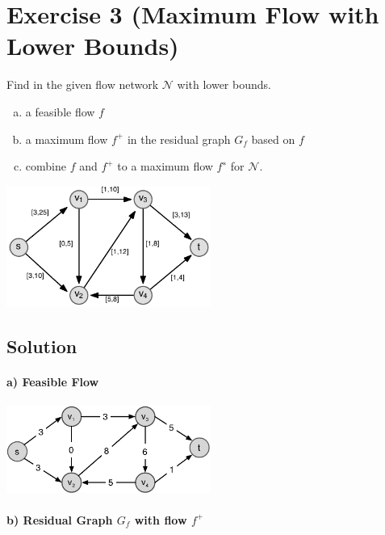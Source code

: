 \documentclass[a4paper, 12pt]{report}
\begin{document}
\section{Exercise 3 (Maximum Flow with Lower Bounds)}

Find in the given flow network $𝒩$ with lower bounds.

\begin{enumerate}[a)]
    \item a feasible flow $f$
    \item a maximum flow $f^+$ in the residual graph $G_f$ based on $f$
    \item combine $f$ and $f^+$ to a maximum flow $f^∗$ for $𝒩$.
\end{enumerate}

\begin{center}
    \includegraphics[width=0.5\textwidth]{Figures/Exercise_2_3}
\end{center}

\subsection{Solution}

\paragraph{a) Feasible Flow}

\begin{center}
    \includegraphics[width=0.5\textwidth]{Figures/Exercise_2_3_a}
\end{center}

\paragraph{b) Residual Graph $G_f$ with flow $f^+$}
\end{document}
